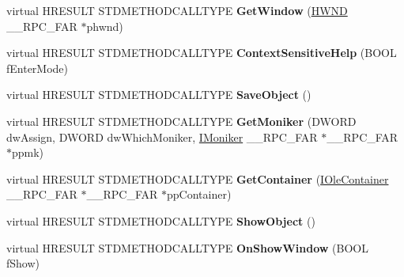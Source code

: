\begin{DoxyCompactItemize}
\item 
\mbox{\label{struct_ole_in_place_client_a451552841ea2808b8bd00f10de86c0f7}} 
virtual H\+R\+E\+S\+U\+LT S\+T\+D\+M\+E\+T\+H\+O\+D\+C\+A\+L\+L\+T\+Y\+PE {\bfseries Get\+Window} (\hyperlink{interfacevoid}{H\+W\+ND} \+\_\+\+\_\+\+R\+P\+C\+\_\+\+F\+AR $\ast$phwnd)
\item 
\mbox{\label{struct_ole_in_place_client_a24b6b7ac53138c1545d508329893125f}} 
virtual H\+R\+E\+S\+U\+LT S\+T\+D\+M\+E\+T\+H\+O\+D\+C\+A\+L\+L\+T\+Y\+PE {\bfseries Context\+Sensitive\+Help} (B\+O\+OL f\+Enter\+Mode)
\item 
\mbox{\label{struct_ole_in_place_client_a95def4d551068320093462ab54fa1e55}} 
virtual H\+R\+E\+S\+U\+LT S\+T\+D\+M\+E\+T\+H\+O\+D\+C\+A\+L\+L\+T\+Y\+PE {\bfseries Save\+Object} ()
\item 
\mbox{\label{struct_ole_in_place_client_ae3b41eb9e1d4af6bf8059fa5b8435f86}} 
virtual H\+R\+E\+S\+U\+LT S\+T\+D\+M\+E\+T\+H\+O\+D\+C\+A\+L\+L\+T\+Y\+PE {\bfseries Get\+Moniker} (D\+W\+O\+RD dw\+Assign, D\+W\+O\+RD dw\+Which\+Moniker, \hyperlink{interface_i_moniker}{I\+Moniker} \+\_\+\+\_\+\+R\+P\+C\+\_\+\+F\+AR $\ast$\+\_\+\+\_\+\+R\+P\+C\+\_\+\+F\+AR $\ast$ppmk)
\item 
\mbox{\label{struct_ole_in_place_client_a034bfd2d4efa7177b482f58eade82dc7}} 
virtual H\+R\+E\+S\+U\+LT S\+T\+D\+M\+E\+T\+H\+O\+D\+C\+A\+L\+L\+T\+Y\+PE {\bfseries Get\+Container} (\hyperlink{interface_i_ole_container}{I\+Ole\+Container} \+\_\+\+\_\+\+R\+P\+C\+\_\+\+F\+AR $\ast$\+\_\+\+\_\+\+R\+P\+C\+\_\+\+F\+AR $\ast$pp\+Container)
\item 
\mbox{\label{struct_ole_in_place_client_a20bc5955b0e1a56f104fd2c7630d2162}} 
virtual H\+R\+E\+S\+U\+LT S\+T\+D\+M\+E\+T\+H\+O\+D\+C\+A\+L\+L\+T\+Y\+PE {\bfseries Show\+Object} ()
\item 
\mbox{\label{struct_ole_in_place_client_a47c88ff76e361b0efc784b5868fcdbd0}} 
virtual H\+R\+E\+S\+U\+LT S\+T\+D\+M\+E\+T\+H\+O\+D\+C\+A\+L\+L\+T\+Y\+PE {\bfseries On\+Show\+Window} (B\+O\+OL f\+Show)
\item 

\end{DoxyCompactItemize}
